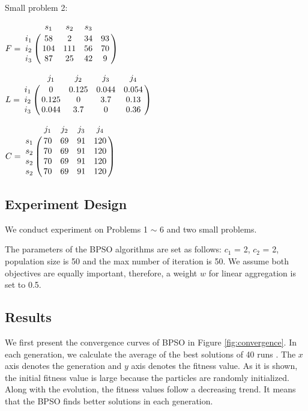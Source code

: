 Small problem 2:

\parbox{.5\linewidth}{

$
F = \bbordermatrix{~ & s_{1} & s_{2} & s_{3} \cr
					i_{1}	&58 &2 &34 &93	\cr
					i_{2}	&104 &111 &56 &70 \cr
					i_{3}	&87 &25 &42 &9 \cr}
$


}
\parbox{.5\linewidth}{

$
L = \bbordermatrix{~ & j_{1} & j_{2} & j_{3} & j_{4}\cr
					i_{1}	&0 &0.125 &0.044 &0.054	\cr
					i_{2}	&0.125  &0 &3.7 &0.13 \cr
					i_{3}	&0.044  &3.7 &0 &0.36 \cr}
$

}

$
C = \bbordermatrix{~ & j_{1} & j_{2} & j_{3} & j_{4}\cr
					s_{1}	&70  &69 &91 &120\cr
					s_{2}	&70  &69 &91 &120\cr
					s_{2}	&70  &69 &91 &120\cr
					s_{2}	&70  &69 &91 &120\cr}
$


\subsection{Experiment Design}
We conduct experiment on Problems 1 $\sim$ 6 and two small problems.

The parameters of the BPSO algorithms are set as follows: $c_1$ = 2, $c_2$ = 2, population size is 50 and the max number of iteration is 50. 
We assume both objectives are equally important, therefore, a weight $w$ for linear aggregation is set to 0.5. 


\subsection{Results}
We first present the convergence curves of BPSO in Figure \ref{fig:convergence}. In each generation, we calculate the average of the best solutions of 40 runs .
The $x$ axis denotes the 
generation and $y$ axis denotes the fitness value. As it is shown, the initial fitness value is large because 
the particles are randomly initialized.  Along with the evolution, the fitness values follow a decreasing trend. It means that the BPSO finds better solutions in each generation.


